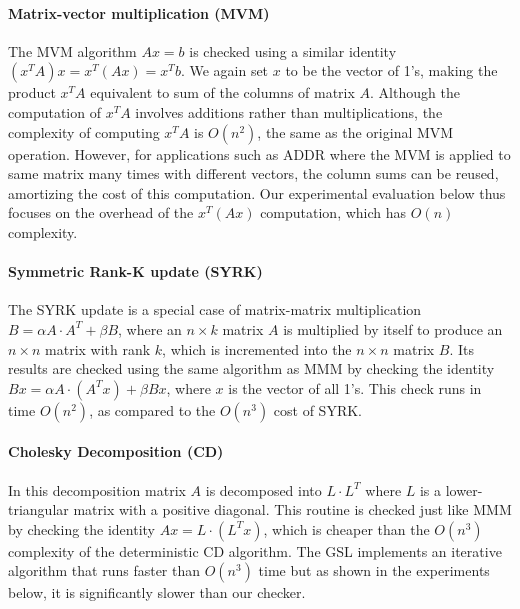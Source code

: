 \documentclass{sig-alternate}
\begin{document}
\paragraph{Matrix-vector multiplication (MVM)}
The MVM algorithm $Ax=b$ is checked using a similar identity $(x^TA)x = x^T(Ax) = x^Tb$.
We again set $x$ to be the vector of 1's, making the product $x^TA$ equivalent to sum of the columns of matrix $A$.
Although the computation of $x^TA$ involves additions rather than multiplications, the complexity of computing $x^TA$ is $O(n^2)$, the same as the original MVM operation.
However, for applications such as ADDR where the MVM is applied to same matrix many times with different vectors, the column sums can be reused, amortizing the cost of this computation.
Our experimental evaluation below thus focuses on the overhead of the $x^T(Ax)$ computation, which has $O(n)$ complexity.

\vspace{-5pt}
\paragraph{Symmetric Rank-K update (SYRK)}
The SYRK update is a special case of matrix-matrix multiplication $B = \alpha A \cdot A^T + \beta B$, where an $n \times k$ matrix $A$ is multiplied by itself to produce an $n \times n$ matrix with rank $k$, which is incremented into the $n \times n$ matrix $B$.
Its results are checked using the same algorithm as MMM by checking the identity $B x = \alpha A \cdot (A^Tx) + \beta B x$, where $x$ is the vector of all 1's.
This check runs in time $O(n^2)$, as compared to the $O(n^3)$ cost of SYRK.

\vspace{-5pt}
\paragraph{Cholesky Decomposition (CD)}
In this decomposition matrix $A$ is decomposed into $L \cdot L^T$ where $L$ is a lower-triangular matrix with a positive diagonal.
This routine is checked just like MMM by checking the identity $Ax = L \cdot (L^T x)$, which is cheaper than the $O(n^3)$ complexity of the deterministic CD algorithm.
The GSL implements an iterative algorithm that runs faster than $O(n^3)$ time but as shown in the experiments below, it is significantly slower than our checker.
\end{document}
